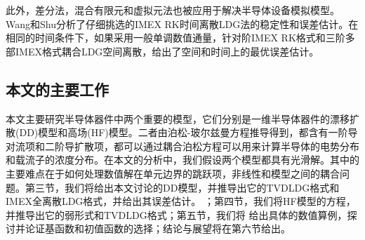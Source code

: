 此外，差分法\cite{ding2019optimal}，混合有限元\cite{gao2018linearized}和虚拟元法\cite{liu2021virtual}也被应用于解决半导体设备模拟模型。
Wang和Shu分析了仔细挑选的IMEX RK时间离散LDG法的稳定性和误差估计\cite{wang2015stability,wang2016stability}。在相同的时间条件下，如果采用一般单调数值通量，针对阶IMEX RK格式和三阶多部IMEX格式耦合LDG空间离散，给出了空间和时间上的最优误差估计。
\subsection{本文的主要工作}
本文主要研究半导体器件中两个重要的模型，它们分别是一维半导体器件的漂移扩散(DD)模型和高场(HF)模型。二者由泊松-玻尔兹曼方程推导得到，都含有一阶导对流项和二阶导扩散项，都可以通过耦合泊松方程可以用来计算半导体的电势分布和载流子的浓度分布。在本文的分析中，我们假设两个模型都具有光滑解。其中的主要难点在于如何处理数值解在单元边界的跳跃项，非线性和模型之间的耦合问题。第三节，我们将给出本文讨论的DD模型，并推导出它的TVDLDG格式和IMEX全离散LDG格式，并给出其误差估计。
；第四节，我们将HF模型的方程，并推导出它的弱形式和TVDLDG格式；第五节，我们将
给出具体的数值算例，探讨并论证基函数和初值函数的选择；结论与展望将在第六节给出。
